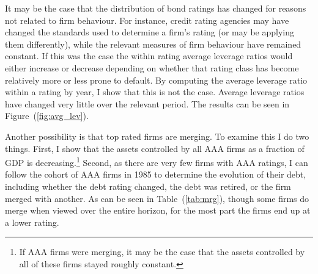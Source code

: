 \documentclass[notitlepage]{article}
\begin{document}
It may be the case that the distribution of bond ratings has changed for reasons not related to firm behaviour. For instance, credit rating agencies may have changed the standards used to determine a firm's rating (or may be applying them differently), while the relevant measures of firm behaviour have remained constant. If this was the case the within rating average leverage ratios would either increase or decrease depending on whether that rating class has become relatively more or less prone to default. By computing the average leverage ratio within a rating by year, I show that this is not the case. Average leverage ratios have changed very little over the relevant period. The results can be seen in Figure~(\ref{fig:avg_lev}). 

Another possibility is that top rated firms are merging. To examine this I do two things. First, I show that the assets controlled by all AAA firms as a fraction of GDP is decreasing.\footnote{If AAA firms were merging, it may be the case that the assets controlled by all of these firms stayed roughly constant.} Second, as there are very few firms with AAA ratings, I can follow the cohort of AAA firms in 1985 to determine the evolution of their debt, including whether the debt rating changed, the debt was retired, or the firm merged with another. As can be seen in Table~(\ref{tab:mrg}), though some firms do merge when viewed over the entire horizon, for the most part the firms end up at a lower rating.

\end{document}
